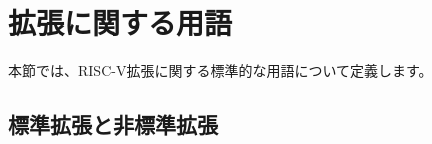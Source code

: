 \begin{comment}
\section{Extension Terminology}
\end{comment}
\section{拡張に関する用語}

\begin{comment}
This section defines some standard terminology for describing RISC-V
extensions.
\end{comment}
本節では、RISC-V拡張に関する標準的な用語について定義します。

\vspace{-0.2in}
\begin{comment}
\subsection*{Standard versus Non-Standard Extension}
\end{comment}
\subsection*{標準拡張と非標準拡張}

\begin{comment}
Any RISC-V processor implementation must support a base integer ISA
(RV32I, RV32E, RV64I, or RV128I).  In addition, an implementation may
support one or more extensions.  We divide extensions into two broad
categories: {\em standard} versus {\em non-standard}.
\begin{itemize}
\item A standard extension is one that is generally useful and that is
  designed to not conflict with any other standard extension.
  Currently, ``MAFDQLCBTPV'', described in other chapters of this
  manual, are either complete or planned standard extensions.
\item A non-standard extension may be highly specialized and may
  conflict with other standard or non-standard extensions.  We
  anticipate a wide variety of non-standard extensions will be
  developed over time, with some eventually being promoted to standard
  extensions.
\end{itemize}
\end{comment}

